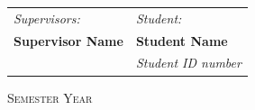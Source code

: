 \vspace{1.5cm}

\begin{tabular}{ll}
	\textit{Supervisors:}        \hspace{6.5cm}   	& \textit{Student:}\\
	\textbf{Supervisor Name}     \hspace{6.5cm}     & \textbf{Student Name}\\  & \textit{Student ID number} \\                     
\end{tabular}
  
\vspace{4cm}

\begin{center}
	\textsc{Semester Year}
\end{center}









